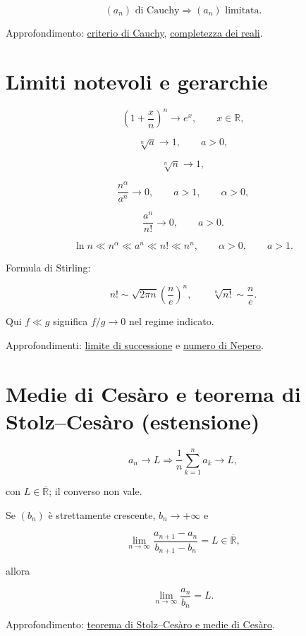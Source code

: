 \[
(a_n)\text{ di Cauchy}
\Longrightarrow
(a_n)\text{ limitata}.
\]

Approfondimento: \href{https://ingegnerismo.it/matematica/criterio-di-cauchy/}{criterio di Cauchy}, \href{https://ingegnerismo.it/matematica/completezza-dei-reali/}{completezza dei reali}.

\section{Limiti notevoli e gerarchie}\label{limiti-notevoli-e-gerarchie}

\[
\left(1+\frac xn\right)^n\to e^x,
\qquad x\in\mathbb R,
\]

\[
\sqrt[n]a\to1,
\qquad a>0,
\]

\[
\sqrt[n]n\to1,
\]

\[
\frac{n^\alpha}{a^n}\to0,
\qquad a>1,
\qquad \alpha>0,
\]

\[
\frac{a^n}{n!}\to0,
\qquad a>0.
\]

\[
\ln n\ll n^\alpha\ll a^n\ll n!\ll n^n,
\qquad
\alpha>0,
\qquad
a>1.
\]

Formula di Stirling:

\[
n!\sim\sqrt{2\pi n}\left(\frac ne\right)^n,
\qquad
\sqrt[n]{n!}\sim\frac ne.
\]

Qui \(f\ll g\) significa \(f/g\to0\) nel regime indicato.

Approfondimenti: \href{https://ingegnerismo.it/matematica/limite-di-successione/}{limite di successione} e \href{https://ingegnerismo.it/matematica/numero-di-nepero/}{numero di Nepero}.

\section{Medie di Cesàro e teorema di Stolz--Cesàro (estensione)}\label{medie-di-cesuxe0ro-e-teorema-di-stolzcesuxe0ro-estensione}

\[
a_n\to L
\Longrightarrow
\frac1n\sum_{k=1}^n a_k\to L,
\]

con \(L\in\overline{\mathbb R}\); il converso non vale.

Se \((b_n)\) è strettamente crescente, \(b_n\to+\infty\) e

\[
\lim_{n\to\infty}\frac{a_{n+1}-a_n}{b_{n+1}-b_n}=L
\in\overline{\mathbb R},
\]

allora

\[
\lim_{n\to\infty}\frac{a_n}{b_n}=L.
\]

Approfondimento: \href{https://ingegnerismo.it/matematica/teorema-di-stolz-cesaro/}{teorema di Stolz--Cesàro e medie di Cesàro}.
